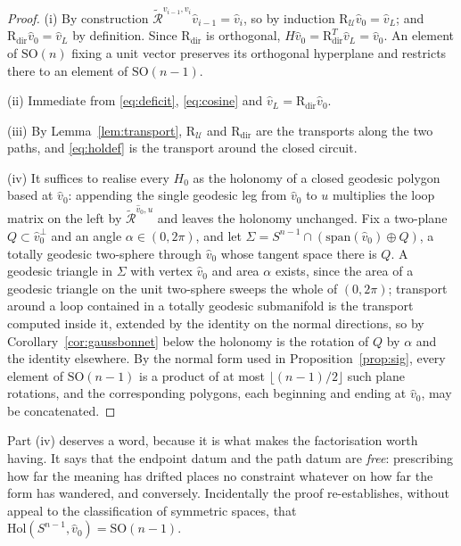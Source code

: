 \documentclass[11pt,a4paper]{article}
\theoremstyle{plain}
\theoremstyle{definition}
\numberwithin{equation}{section}
\newcommand{\SO}{\mathrm{SO}}
\newcommand{\Hol}{\mathrm{Hol}}
\newcommand{\Rmin}{\widetilde{\mathcal{R}}}
\newcommand{\Uc}{\mathcal{U}}
\begin{document}
\begin{proof}
(i) By construction $\Rmin^{v_{i-1},v_i}\hat{v}_{i-1} = \hat{v}_i$, so
by induction $\mathrm{R}_\Uc \hat{v}_0 = \hat{v}_L$; and
$\mathrm{R}_{\mathrm{dir}}\hat{v}_0 = \hat{v}_L$ by definition. Since
$\mathrm{R}_{\mathrm{dir}}$ is orthogonal,
$H\hat{v}_0 = \mathrm{R}_{\mathrm{dir}}^{T}\hat{v}_L = \hat{v}_0$. An
element of $\SO(n)$ fixing a unit vector preserves its orthogonal
hyperplane and restricts there to an element of $\SO(n-1)$.

(ii) Immediate from \eqref{eq:deficit}, \eqref{eq:cosine} and
$\hat{v}_L = \mathrm{R}_{\mathrm{dir}}\hat{v}_0$.

(iii) By Lemma~\ref{lem:transport}, $\mathrm{R}_\Uc$ and
$\mathrm{R}_{\mathrm{dir}}$ are the transports along the two paths, and
\eqref{eq:holdef} is the transport around the closed circuit.

(iv) It suffices to realise every $H_0$ as the holonomy of a closed
geodesic polygon based at $\hat{v}_0$: appending the single geodesic leg
from $\hat{v}_0$ to $u$ multiplies the loop matrix on the left by
$\Rmin^{\hat{v}_0,u}$ and leaves the holonomy unchanged. Fix a two-plane
$Q \subset \hat{v}_0^{\perp}$ and an angle $\alpha \in (0,2\pi)$, and let
$\Sigma = S^{n-1}\cap(\mathrm{span}(\hat{v}_0)\oplus Q)$, a totally
geodesic two-sphere through $\hat{v}_0$ whose tangent space there is
$Q$. A geodesic triangle in $\Sigma$ with vertex $\hat{v}_0$ and area
$\alpha$ exists, since the area of a geodesic triangle on the unit
two-sphere sweeps the whole of $(0,2\pi)$; transport around a loop
contained in a totally geodesic submanifold is the transport computed
inside it, extended by the identity on the normal directions, so by
Corollary~\ref{cor:gaussbonnet} below the holonomy is the rotation of
$Q$ by $\alpha$ and the identity elsewhere. By the normal form used in
Proposition~\ref{prop:sig}, every element of $\SO(n-1)$ is a product of
at most $\lfloor (n-1)/2 \rfloor$ such plane rotations, and the
corresponding polygons, each beginning and ending at $\hat{v}_0$, may be
concatenated.
\end{proof}

Part (iv) deserves a word, because it is what makes the factorisation
worth having. It says that the endpoint datum and the path datum are
\emph{free}: prescribing how far the meaning has drifted places no
constraint whatever on how far the form has wandered, and conversely.
Incidentally the proof re-establishes, without appeal to the
classification of symmetric spaces, that
$\Hol(S^{n-1},\hat{v}_0) = \SO(n-1)$.
\end{document}
